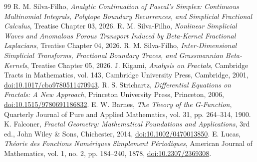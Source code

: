 \documentclass[11pt,a4paper]{article}
\theoremstyle{plain}
\theoremstyle{definition}
\theoremstyle{remark}
\numberwithin{equation}{section}
\begin{document}
\begin{thebibliography}{99}
 R. M. Silva-Filho, \emph{Analytic Continuation of Pascal's Simplex: Continuous Multinomial Integrals, Polytope Boundary Recurrences, and Simplicial Fractional Calculus}, Treatise Chapter 03, 2026.
 R. M. Silva-Filho, \emph{Nonlinear Simplicial Waves and Anomalous Porous Transport Induced by Beta-Kernel Fractional Laplacians}, Treatise Chapter 04, 2026.
 R. M. Silva-Filho, \emph{Inter-Dimensional Simplicial Transforms, Fractional Boundary Traces, and Grassmannian Beta-Kernels}, Treatise Chapter 05, 2026.
 J. Kigami, \emph{Analysis on Fractals}, Cambridge Tracts in Mathematics, vol. 143, Cambridge University Press, Cambridge, 2001, \href{https://doi.org/10.1017/cbo9780511470943}{doi:10.1017/cbo9780511470943}.
 R. S. Strichartz, \emph{Differential Equations on Fractals: A New Approach}, Princeton University Press, Princeton, 2006, \href{https://doi.org/10.1515/9780691186832}{doi:10.1515/9780691186832}.
 E. W. Barnes, \emph{The Theory of the G-Function}, Quarterly Journal of Pure and Applied Mathematics, vol. 31, pp. 264--314, 1900.
 K. Falconer, \emph{Fractal Geometry: Mathematical Foundations and Applications}, 3rd ed., John Wiley \& Sons, Chichester, 2014, \href{https://doi.org/10.1002/0470013850}{doi:10.1002/0470013850}.
 E. Lucas, \emph{Th\'eorie des Fonctions Num\'eriques Simplement P\'eriodiques}, American Journal of Mathematics, vol. 1, no. 2, pp. 184--240, 1878, \href{https://doi.org/10.2307/2369308}{doi:10.2307/2369308}.
\end{thebibliography}
\end{document}
